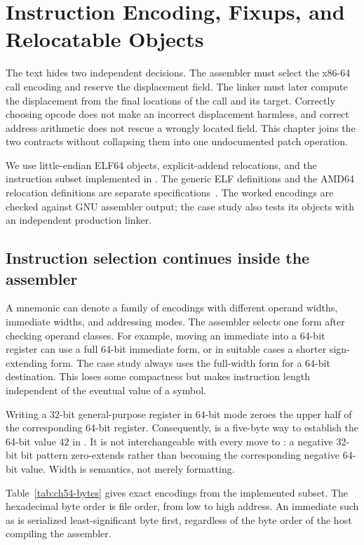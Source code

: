 \chapter{Instruction Encoding, Fixups, and Relocatable Objects}
\label{ch:assembly-encoding}

The text  hides two independent decisions.
The assembler must select the x86-64 call encoding and reserve the displacement field.
The linker must later compute the displacement from the final locations of the call and its target.
Correctly choosing opcode  does not make an incorrect displacement harmless, and correct address arithmetic does not rescue a wrongly located field.
This chapter joins the two contracts without collapsing them into one undocumented patch operation.

We use little-endian ELF64 objects, explicit-addend relocations, and the instruction subset implemented in .
The generic ELF definitions and the AMD64 relocation definitions are separate specifications~\cite{xinuos-2026-elf,matz-2012-amd64}.
The worked encodings are checked against GNU assembler output; the case study also tests its objects with an independent production linker.

\section{Instruction selection continues inside the assembler}
\label{sec:ch54-forms}

A mnemonic can denote a family of encodings with different operand widths, immediate widths, and addressing modes.
The assembler selects one form after checking operand classes.
For example, moving an immediate into a 64-bit register can use a full 64-bit immediate form, or in suitable cases a shorter sign-extending form.
The case study always uses the full-width form for a 64-bit destination.
This loses some compactness but makes instruction length independent of the eventual value of a symbol.

Writing a 32-bit general-purpose register in 64-bit mode zeroes the upper half of the corresponding 64-bit register.
Consequently,  is a five-byte way to establish the 64-bit value $42$ in .
It is not interchangeable with every move to : a negative 32-bit bit pattern zero-extends rather than becoming the corresponding negative 64-bit value.
Width is semantics, not merely formatting.

Table~\ref{tab:ch54-bytes} gives exact encodings from the implemented subset.
The hexadecimal byte order is file order, from low to high address.
An immediate such as  is serialized least-significant byte first, regardless of the byte order of the host compiling the assembler.

